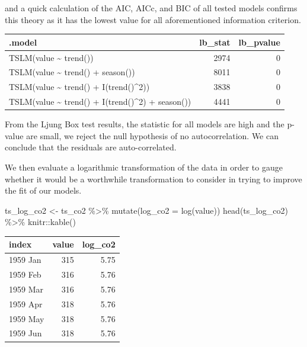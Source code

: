 \documentclass[AER]{AEA}
\newenvironment{Shaded}{\begin{snugshade}}{\end{snugshade}}
\newcommand{\AttributeTok}[1]{\textcolor[rgb]{0.77,0.63,0.00}{#1}}
\newcommand{\FunctionTok}[1]{\textcolor[rgb]{0.00,0.00,0.00}{#1}}
\newcommand{\NormalTok}[1]{#1}
\newcommand{\OtherTok}[1]{\textcolor[rgb]{0.56,0.35,0.01}{#1}}
\newcommand{\SpecialCharTok}[1]{\textcolor[rgb]{0.00,0.00,0.00}{#1}}
\begin{document}
and a quick calculation of the AIC, AICc, and BIC of all tested models
confirms this theory as it has the lowest value for all aforementioned
information criterion.

\begin{longtable}[]{@{}lrr@{}}
\toprule
.model & lb\_stat & lb\_pvalue \\
\midrule
\endhead
TSLM(value \textasciitilde{} trend()) & 2974 & 0 \\
TSLM(value \textasciitilde{} trend() + season()) & 8011 & 0 \\
TSLM(value \textasciitilde{} trend() + I(trend()\^{}2)) & 3838 & 0 \\
TSLM(value \textasciitilde{} trend() + I(trend()\^{}2) + season()) &
4441 & 0 \\
\bottomrule
\end{longtable}

From the Ljung Box test results, the statistic for all models are high
and the p-value are small, we reject the null hypothesis of no
autocorrelation. We can conclude that the residuals are auto-correlated.

We then evaluate a logarithmic transformation of the data in order to
gauge whether it would be a worthwhile transformation to consider in
trying to improve the fit of our models.

\begin{Shaded}
\begin{Highlighting}[]
\NormalTok{ts\_log\_co2 }\OtherTok{\textless{}{-}}\NormalTok{ ts\_co2 }\SpecialCharTok{\%\textgreater{}\%} 
      \FunctionTok{mutate}\NormalTok{(}\AttributeTok{log\_co2 =} \FunctionTok{log}\NormalTok{(value))}
\FunctionTok{head}\NormalTok{(ts\_log\_co2) }\SpecialCharTok{\%\textgreater{}\%}\NormalTok{ knitr}\SpecialCharTok{::}\FunctionTok{kable}\NormalTok{()}
\end{Highlighting}
\end{Shaded}

\begin{longtable}[]{@{}lrr@{}}
\toprule
index & value & log\_co2 \\
\midrule
\endhead
1959 Jan & 315 & 5.75 \\
1959 Feb & 316 & 5.76 \\
1959 Mar & 316 & 5.76 \\
1959 Apr & 318 & 5.76 \\
1959 May & 318 & 5.76 \\
1959 Jun & 318 & 5.76 \\
\bottomrule
\end{longtable}
\end{document}
